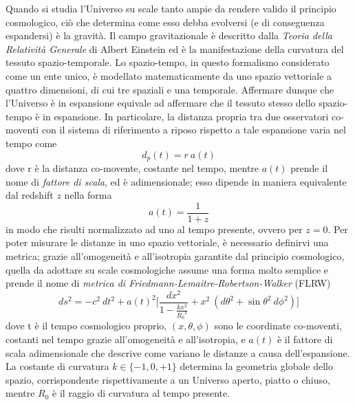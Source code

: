 Quando si studia l'Universo su scale tanto ampie da rendere valido il principio cosmologico, ciò che determina come esso debba evolversi (e di conseguenza espandersi) è la gravità. Il campo gravitazionale è descritto dalla \emph{Teoria della Relatività Generale} di Albert Einstein ed è la manifestazione della curvatura del tessuto spazio-temporale. Lo spazio-tempo, in questo
formalismo considerato come un ente unico, è modellato matematicamente da uno spazio vettoriale a quattro dimensioni, di cui tre spaziali e una temporale. Affermare dunque che l'Universo è in espansione equivale ad affermare che il tessuto stesso dello spazio-tempo è in espansione. In particolare, la distanza propria tra due osservatori co-moventi con il sistema di riferimento a riposo rispetto a tale espansione varia nel tempo come $$ d_p(t)= r\ a(t)$$ dove r è la distanza co-movente, costante nel tempo, mentre $a(t)$ prende il nome di \emph{fattore di scala}, ed è adimensionale; esso dipende in maniera equivalente dal redshift $z$ nella forma
\begin{equation}
    a(t) = \frac{1}{1+z}
\end{equation}
in modo che risulti normalizzato ad uno al tempo presente, ovvero per $z=0$.
Per poter misurare le distanze in uno spazio vettoriale, è necessario definirvi una metrica; grazie all'omogeneità e all'isotropia garantite dal principio cosmologico, quella da adottare su scale cosmologiche assume una forma molto semplice e prende il nome di \emph{metrica di Friedmann-Lemaitre-Robertson-Walker} (FLRW)
\begin{equation}
    ds^2=-c^2\ dt^2+ a(t)^2\Bigg[\frac{dx^2}{1-\frac{kx^2}{{R_0}^2}}+x^2\ (d\theta^2+\sin\theta^2 \ d\phi^2)\Bigg]
    \label{eq:FLRW}
\end{equation}
dove 
t è il tempo cosmologico proprio, 
$(x, \theta, \phi)$ sono le coordinate co-moventi, costanti nel tempo grazie all'omogeneità e all'isotropia, e $a(t)$ è il fattore di scala adimensionale che descrive come variano le distanze a causa dell'espansione. La costante di curvatura $k \in \{ -1, 0 , +1\}$ determina la geometria globale dello spazio, corrispondente rispettivamente a un Universo aperto, piatto o chiuso, mentre $R_0$ è il raggio di curvatura al tempo presente.

